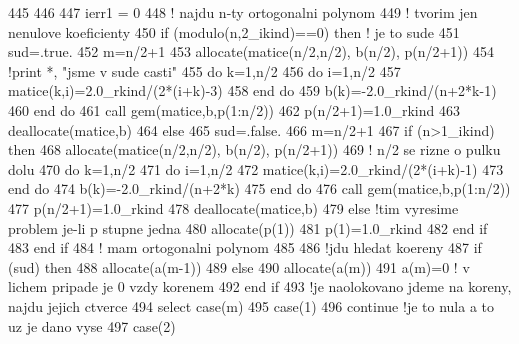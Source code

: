 \begin{DoxyCode}
445 
446 
447       ierr1 = 0
448       \textcolor{comment}{! najdu n-ty ortogonalni polynom
}
449       \textcolor{comment}{! tvorim jen nenulove koeficienty
}
450       \textcolor{keywordflow}{if} (modulo(n,2\_ikind)==0) \textcolor{keywordflow}{then} \textcolor{comment}{! je to sude
}
451         sud=.true.
452         m=n/2+1
453         \textcolor{keyword}{allocate}(matice(n/2,n/2), b(n/2), p(n/2+1)) 
454         \textcolor{comment}{!print *, "jsme v sude casti"
}
455         \textcolor{keywordflow}{do} k=1,n/2
456           \textcolor{keywordflow}{do} i=1,n/2
457             matice(k,i)=2.0\_rkind/(2*(i+k)-3)
458 \textcolor{keyword}{          end }do
459           b(k)=-2.0\_rkind/(n+2*k-1)
460 \textcolor{keyword}{        end }do
461         \textcolor{keyword}{call }gem(matice,b,p(1:n/2))
462         p(n/2+1)=1.0\_rkind
463         \textcolor{keyword}{deallocate}(matice,b)
464       \textcolor{keywordflow}{else} 
465         sud=.false.
466         m=n/2+1
467         \textcolor{keywordflow}{if} (n>1\_ikind) \textcolor{keywordflow}{then}             
468           \textcolor{keyword}{allocate}(matice(n/2,n/2), b(n/2), p(n/2+1))
469           \textcolor{comment}{! n/2 se rizne o pulku dolu
}
470           \textcolor{keywordflow}{do} k=1,n/2
471             \textcolor{keywordflow}{do} i=1,n/2
472               matice(k,i)=2.0\_rkind/(2*(i+k)-1)
473 \textcolor{keyword}{            end }do
474             b(k)=-2.0\_rkind/(n+2*k)
475 \textcolor{keyword}{          end }do
476           \textcolor{keyword}{call }gem(matice,b,p(1:n/2))
477           p(n/2+1)=1.0\_rkind
478           \textcolor{keyword}{deallocate}(matice,b)
479             \textcolor{keywordflow}{else} \textcolor{comment}{!tim vyresime problem je-li p stupne jedna
}
480           \textcolor{keyword}{allocate}(p(1))
481           p(1)=1.0\_rkind
482 \textcolor{keyword}{        end }if
483 \textcolor{keyword}{      end }if
484       \textcolor{comment}{! mam ortogonalni polynom
}
485 
486       \textcolor{comment}{!jdu hledat koereny
}
487       \textcolor{keywordflow}{if} (sud) then
488         \textcolor{keyword}{allocate}(a(m-1))
489       else
490         \textcolor{keyword}{allocate}(a(m))
491         a(m)=0 \textcolor{comment}{! v lichem pripade je 0 vzdy korenem
}
492 \textcolor{keyword}{      end }if
493       \textcolor{comment}{!je naolokovano jdeme na koreny, najdu jejich ctverce
}
494       \textcolor{keywordflow}{select case}(m)
495         \textcolor{keywordflow}{case}(1)
496           \textcolor{keywordflow}{continue} \textcolor{comment}{!je to nula a to uz je dano vyse
}
497         \textcolor{keywordflow}{case}(2)

\end{DoxyCode}
